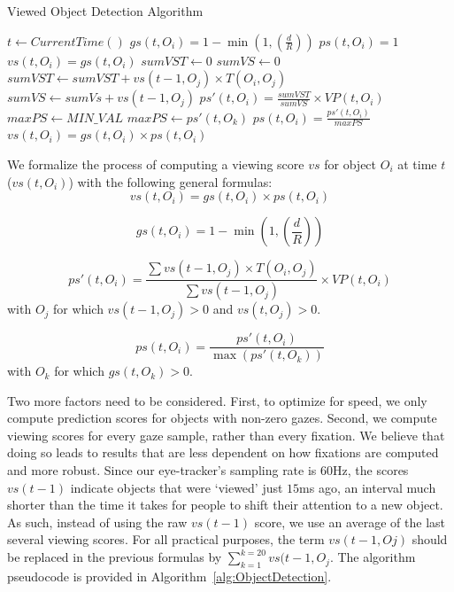 \begin{algorithm}
\caption{Viewed Object Detection Algorithm}
\label{alg:ObjectDetection}
\begin{algorithmic}[1]
	\STATE $t \gets CurrentTime()$
	\STATE $gs(t, O_i) = 1 - \min{(1, (\frac{d}{R}))}$
		\STATE $ps(t, O_i) = 1$
		\STATE $vs(t, O_i) = gs(t,O_i)$
	\ELSE
		\STATE $sumVST \gets 0$
		\STATE $sumVS \gets 0$
				\STATE $sumVST \gets sumVST + vs(t-1, O_j) \times T(O_i,O_j)$
				\STATE $sumVS \gets sumVs + vs(t-1, O_j)$				
			\ENDIF
		\ENDFOR
		\STATE $ps'(t, O_i) = \frac{sumVST}{sumVS} \times VP(t, O_i)$
		\STATE $maxPS \gets MIN\_VAL$
				\STATE $maxPS \gets ps'(t,O_k)$
			\ENDIF
		\ENDFOR
		\STATE $ps(t,O_i) = \frac{ps'(t, O_i)}{maxPS}$
		\STATE $vs(t, O_i) = gs(t, O_i) \times ps(t, O_i)$
	\ENDIF
\ENDFOR
\end{algorithmic}
\end{algorithm}

We formalize the process of computing a viewing score $vs$ for object $O_i$ at time $t$  ($vs(t,O_i)$) with the following general formulas:
\begin{equation}
vs(t, O_i) = gs(t, O_i) \times ps(t, O_i)
\label{eq:VS}
\end{equation}

\begin{equation}
gs(t, O_i) = 1 - \min{(1, (\frac{d}{R}))}
\label{eq:GS}
\end{equation}

\begin{equation}
ps'(t, O_i) = \frac{\sum{vs(t-1, O_j)} \times T(O_i,O_j)}{\sum{vs(t-1, O_j)}} \times VP(t, O_i)
\label{eq:PSDash}
\end{equation}
with $O_j$ for which $vs(t-1, O_j) > 0$ and $vs(t, O_j) > 0$.

\begin{equation}
ps(t,O_i) = \frac{ps'(t, O_i)}{\max (ps'(t, O_k))}
\label{eq:PS}
\end{equation}
with $O_k$ for which $gs(t,O_k) >0$.

Two more factors need to be considered. First, to optimize for speed, we only compute prediction scores for objects with non-zero gazes. Second, we compute viewing scores for every gaze sample, rather than every fixation. We believe that doing so leads to results that are less dependent on how fixations are computed and more robust. Since our eye-tracker's sampling rate is $60$Hz, the scores $vs(t-1)$ indicate objects that were `viewed' just $15$ms ago, an interval much shorter than the time it takes for people to shift their attention to a new object. As such, instead of using the raw $vs(t-1)$ score, we use an average of the last several viewing scores. For all practical purposes, the term $vs(t-1,Oj)$ should be replaced in the previous formulas by $ \sum_{k=1}^{k=20}{vs(t-1, O_j}$. The algorithm pseudocode is provided in Algorithm~\ref{alg:ObjectDetection}.


